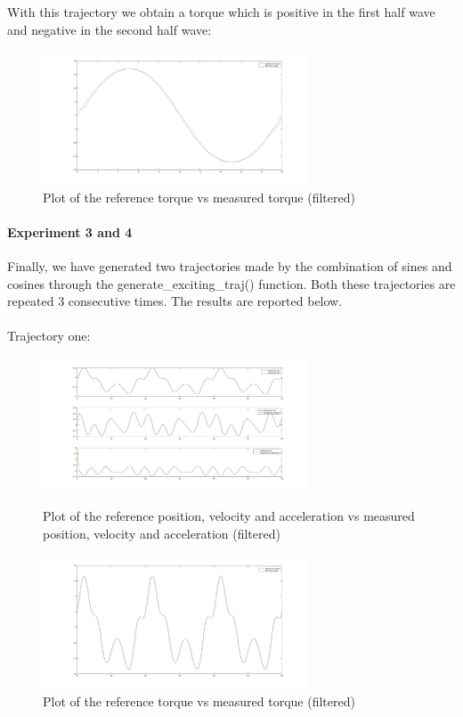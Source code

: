 \documentclass{article}
\begin{document}
\noindent With this trajectory we obtain a torque which is positive in the first half wave and negative in the second half wave:

\begin{figure}[!htbp]
\centering
\includegraphics[width=0.7\textwidth]{images/1-dof/new_experiment2.png}
\caption{Plot of the reference torque vs measured torque (filtered)}
\end{figure}
\pagebreak

\paragraph{Experiment 3 and 4}Finally, we have generated two trajectories made by the combination of sines and cosines through the generate\_exciting\_traj() function. Both these trajectories are repeated 3 consecutive times. The results are reported below.
\paragraph{}Trajectory one:

\begin{figure}[!htbp]
\centering
\includegraphics[width=0.7\textwidth]{images/1-dof/new_experiment3_traj.png}
\caption{Plot of the reference position, velocity and acceleration vs measured position, velocity and acceleration (filtered)}
\includegraphics[width=0.7\textwidth]{images/1-dof/new_experiment3.png}
\caption{Plot of the reference torque vs measured torque (filtered)}
\end{figure}
\FloatBarrier
\end{document}
